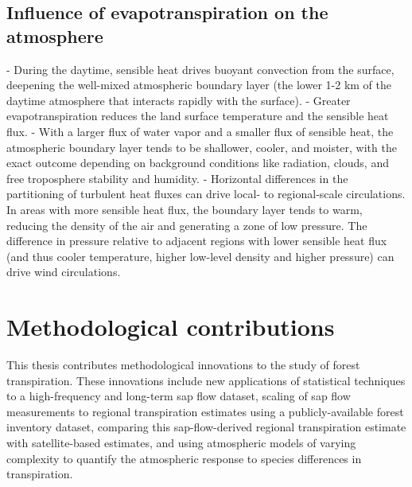 \subsection{Influence of evapotranspiration on the atmosphere}
- During the daytime, sensible heat drives buoyant convection from the surface, deepening the well-mixed atmospheric boundary layer (the lower 1-2 km of the daytime atmosphere that interacts rapidly with the surface).
- Greater evapotranspiration reduces the land surface temperature and the sensible heat flux.
- With a larger flux of water vapor and a smaller flux of sensible heat, the atmospheric boundary layer tends to be shallower, cooler, and moister, with the exact outcome depending on background conditions like radiation, clouds, and free troposphere stability and humidity.
- Horizontal differences in the partitioning of turbulent heat fluxes can drive local- to regional-scale circulations.  In areas with more sensible heat flux, the boundary layer tends to warm, reducing the density of the air and generating a zone of low pressure.  The difference in pressure relative to adjacent regions with lower sensible heat flux (and thus cooler temperature, higher low-level density and higher pressure) can drive wind circulations.

\section{Methodological contributions}

This thesis contributes methodological innovations to the study of forest transpiration.  These innovations include new applications of statistical techniques to a high-frequency and long-term sap flow dataset, scaling of sap flow measurements to regional transpiration estimates using a publicly-available forest inventory dataset, comparing this sap-flow-derived regional transpiration estimate with satellite-based estimates, and using atmospheric models of varying complexity to quantify the atmospheric response to species differences in transpiration.

